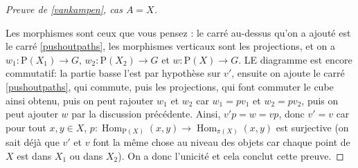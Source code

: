 \documentclass{article}
\renewcommand{\P}{\mathrm{P}}
\DeclareMathOperator{\Hom}{Hom}
\theoremstyle{definition}
\theoremstyle{remark}
\begin{document}
\begin{proof}[Preuve de \ref{vankampen}, cas $A=X$]
\begin{center}
    \end{center}
    Les morphismes sont ceux que vous pensez : le carré au-dessus qu'on a ajouté est le carré \ref{pushoutpaths}, les morphismes verticaux sont les projections, et on a $w_1 : \P (X_1) \to G$, $w_2 : \P (X_2) \to G$ et $w : \P(X) \to G$. LE diagramme est encore commutatif: la partie basse l'est par hypothèse sur $v'$, ensuite on ajoute le carré \ref{pushoutpaths}, qui commute, puis les projections, qui font commuter le cube ainsi obtenu, puis on peut rajouter $w_1$ et $w_2$ car $w_1 = pv_1$ et $w_2 = pv_2$, puis on peut ajouter $w$ par la discussion précédente. Ainsi, $v'p = w = vp$, donc $v' = v$ car pour tout $x,y \in X$, $p : \Hom_{\P(X)}(x,y) \to \Hom_{\pi(X)}(x,y)$ est surjective (on sait déjà que $v'$ et $v$ font la même chose au niveau des objets car chaque point de $X$ est dans $X_1$ ou dans $X_2$). On a donc l'unicité et cela conclut cette preuve.
\end{proof}
\end{document}
